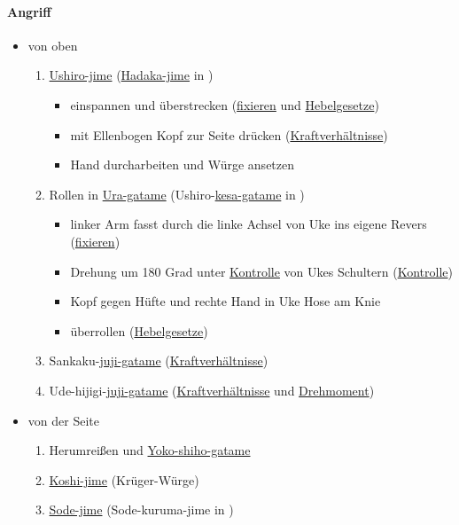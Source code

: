 \documentclass[justified, a4paper, notitlepage, captions=tableheading, nobib]{tufte-handout}
\begin{document}
\paragraph{Angriff}
\label{sec:orgda64d5f}
\begin{itemize}
\item von oben
\begin{enumerate}
\item \hyperref[orgf7974da]{Ushiro-jime} (\hyperref[orge60cf12]{Hadaka-jime} in \citep[S. 58]{kashiwazaki1992shimewaza})
\begin{itemize}
\item einspannen und überstrecken (\hyperref[org62822f6]{fixieren} und \hyperref[org6c6f271]{Hebelgesetze})
\item mit Ellenbogen Kopf zur Seite drücken (\hyperref[org19c3698]{Kraftverhältnisse})
\item Hand durcharbeiten und Würge ansetzen
\end{itemize}
\item Rollen in \hyperref[org5a515a8]{Ura-gatame} (Ushiro-\hyperref[org06d0492]{kesa-gatame} in \citep[S. 104]{komuro2011komlock})
\begin{itemize}
\item linker Arm fasst durch die linke Achsel von Uke ins eigene Revers (\hyperref[org62822f6]{fixieren})
\item Drehung um 180 Grad unter \hyperref[org15bbf8e]{Kontrolle} von Ukes Schultern (\hyperref[org15bbf8e]{Kontrolle})
\item Kopf gegen Hüfte und rechte Hand in Uke Hose am Knie
\item überrollen (\hyperref[org6c6f271]{Hebelgesetze})
\end{itemize}
\item Sankaku-\hyperref[orgd926b87]{juji-gatame} \citep[S. 32]{kashiwazaki2012einführung} (\hyperref[org19c3698]{Kraftverhältnisse})
\item Ude-hijigi-\hyperref[orgd926b87]{juji-gatame} \citep[S. 27]{kashiwazaki2012einführung} (\hyperref[org19c3698]{Kraftverhältnisse} und \hyperref[org1d7d4fc]{Drehmoment})
\end{enumerate}
\item von der Seite
\begin{enumerate}
\item Herumreißen und \hyperref[orgb26bb0a]{Yoko-shiho-gatame}
\item \hyperref[org911829b]{Koshi-jime} (Krüger-Würge)
\item \hyperref[org9269882]{Sode-jime} (Sode-kuruma-jime in \citep[S. 86]{komuro2011komlock})

\end{enumerate}
\end{itemize}
\end{document}
